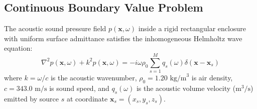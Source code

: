 \documentclass[11pt,a4paper,titlepage]{article}
\begin{document}
\subsection{Continuous Boundary Value Problem}
The acoustic sound pressure field $p(\mathbf{x}, \omega)$ inside a rigid rectangular enclosure with uniform surface admittance satisfies the inhomogeneous Helmholtz wave equation:
\begin{equation}
    \nabla^2 p(\mathbf{x}, \omega) + k^2 p(\mathbf{x}, \omega) = -i \omega \rho_0 \sum_{s=1}^M q_s(\omega) \delta(\mathbf{x} - \mathbf{x}_s)
\end{equation}
where $k = \omega / c$ is the acoustic wavenumber, $\rho_0 = 1.20\text{ kg/m}^3$ is air density, $c = 343.0\text{ m/s}$ is sound speed, and $q_s(\omega)$ is the acoustic volume velocity ($\text{m}^3/\text{s}$) emitted by source $s$ at coordinate $\mathbf{x}_s = (x_s, y_s, z_s)$.
\end{document}
